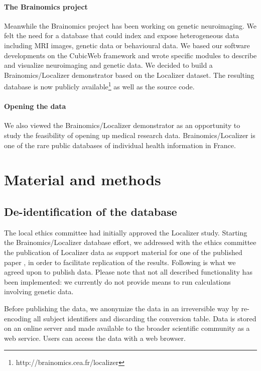 \documentclass[preprint,review,12pt]{elsarticle}
\begin{document}
\paragraph{The Brainomics project} Meanwhile the Brainomics project has been working on genetic neuroimaging. We felt the need for a database that could index and expose heterogeneous data including MRI images, genetic data or behavioural data. We based our software developments on the CubicWeb framework and wrote specific modules to describe and visualize neuroimaging and genetic data. We decided to build a Brainomics/Localizer demonstrator based on the Localizer dataset. The resulting database is now publicly available\footnote{http://brainomics.cea.fr/localizer} as well as the source code.

\paragraph{Opening the data} We also viewed the Brainomics/Localizer demonstrator as an opportunity to study the feasibility of opening up medical research data. Brainomics/Localizer is one of the rare public databases of individual health information in France.


\section{Material and methods}

\subsection{De-identification of the database}

The local ethics committee had initially approved the Localizer study. Starting the Brainomics/Localizer database effort, we addressed with the ethics committee the publication of Localizer data as support material for one of the published paper \cite{Pinel2012}, in order to facilitate replication of the results. Following is what we agreed upon to publish data. Please note that not all described functionality has been implemented: we currently do not provide means to run calculations involving genetic data.

Before publishing the data, we anonymize the data in an irreversible way by re-encoding all subject identifiers and discarding the conversion table. Data is stored on an online server and made available to the broader scientific community as a web service. Users can access the data with a web browser.
\end{document}
